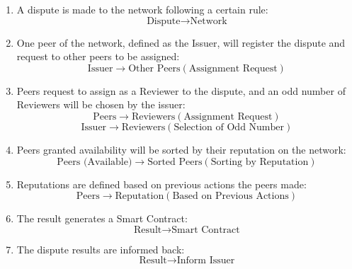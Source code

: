 \documentclass{article}
\begin{document}
\begin{enumerate}
    \item A dispute is made to the network following a certain rule:
    \[\text{{Dispute}} \rightarrow \text{{Network}}\]
    \item One peer of the network, defined as the Issuer, will register the dispute and request to other peers to be assigned:
    \[\text{{Issuer}} \rightarrow \text{{Other Peers}} (\text{{Assignment Request}})\]
    \item Peers request to assign as a Reviewer to the dispute, and an odd number of Reviewers will be chosen by the issuer:
    \[\text{{Peers}} \rightarrow \text{{Reviewers}} (\text{{Assignment Request}})\]
    \[\text{{Issuer}} \rightarrow \text{{Reviewers}} (\text{{Selection of Odd Number}})
\]
    \item Peers granted availability will be sorted by their reputation on the network:
    \[\text{{Peers (Available)}} \rightarrow \text{{Sorted Peers}} (\text{{Sorting by Reputation}})\]
    \item Reputations are defined based on previous actions the peers made:
    \[\text{{Peers}} \rightarrow \text{{Reputation}} (\text{{Based on Previous Actions}})
\]
    \item The result generates a Smart Contract:
    \[\text{{Result}} \rightarrow \text{{Smart Contract}}\]
    \item The dispute results are informed back:
    \[\text{{Result}} \rightarrow \text{{Inform Issuer}}\]
\end{enumerate}
\end{document}

